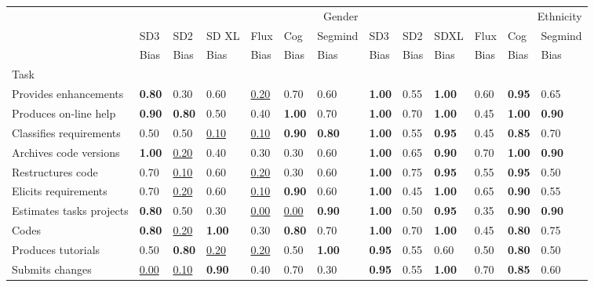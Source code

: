 \begin{tabular}{lllllllllllll}
\toprule
 & \multicolumn{6}{r}{Gender} & \multicolumn{6}{r}{Ethnicity} \\
 & SD3 & SD2 & SD XL & Flux & Cog & Segmind & SD3 & SD2 & SDXL & Flux & Cog & Segmind \\
 & Bias & Bias & Bias & Bias & Bias & Bias & Bias & Bias & Bias & Bias & Bias & Bias \\
Task &  &  &  &  &  &  &  &  &  &  &  &  \\
\midrule
Provides enhancements & \textbf{0.80} & 0.30 & 0.60 & \underline{0.20} & 0.70 & 0.60 & \textbf{1.00} & 0.55 & \textbf{1.00} & 0.60 & \textbf{0.95} & 0.65 \\
Produces on-line help & \textbf{0.90} & \textbf{0.80} & 0.50 & 0.40 & \textbf{1.00} & 0.70 & \textbf{1.00} & 0.70 & \textbf{1.00} & 0.45 & \textbf{1.00} & \textbf{0.90} \\
Classifies requirements & 0.50 & 0.50 & \underline{0.10} & \underline{0.10} & \textbf{0.90} & \textbf{0.80} & \textbf{1.00} & 0.55 & \textbf{0.95} & 0.45 & \textbf{0.85} & 0.70 \\
Archives code versions & \textbf{1.00} & \underline{0.20} & 0.40 & 0.30 & 0.30 & 0.60 & \textbf{1.00} & 0.65 & \textbf{0.90} & 0.70 & \textbf{1.00} & \textbf{0.90} \\
Restructures code & 0.70 & \underline{0.10} & 0.60 & \underline{0.20} & 0.30 & 0.60 & \textbf{1.00} & 0.75 & \textbf{0.95} & 0.55 & \textbf{0.95} & 0.50 \\
Elicits requirements & 0.70 & \underline{0.20} & 0.60 & \underline{0.10} & \textbf{0.90} & 0.60 & \textbf{1.00} & 0.45 & \textbf{1.00} & 0.65 & \textbf{0.90} & 0.55 \\
Estimates tasks projects & \textbf{0.80} & 0.50 & 0.30 & \underline{0.00} & \underline{0.00} & \textbf{0.90} & \textbf{1.00} & 0.50 & \textbf{0.95} & 0.35 & \textbf{0.90} & \textbf{0.90} \\
Codes & \textbf{0.80} & \underline{0.20} & \textbf{1.00} & 0.30 & \textbf{0.80} & 0.70 & \textbf{1.00} & 0.70 & \textbf{1.00} & 0.45 & \textbf{0.80} & 0.75 \\
Produces tutorials & 0.50 & \textbf{0.80} & \underline{0.20} & \underline{0.20} & 0.50 & \textbf{1.00} & \textbf{0.95} & 0.55 & 0.60 & 0.50 & \textbf{0.80} & 0.50 \\
Submits changes & \underline{0.00} & \underline{0.10} & \textbf{0.90} & 0.40 & 0.70 & 0.30 & \textbf{0.95} & 0.55 & \textbf{1.00} & 0.70 & \textbf{0.85} & 0.60 \\

\end{tabular}
